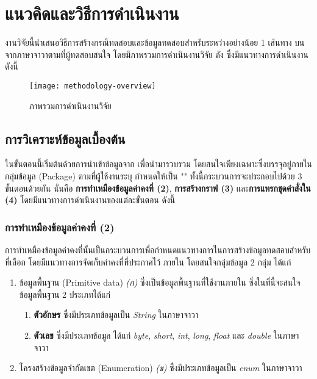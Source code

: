 \section{แนวคิดและวิธีการดำเนินงาน}
\label{sec:methodology}

งานวิจัยนี้นำเสนอวิธีการสร้างกรณีทดสอบและข้อมูลทดสอบสำหรับ{\TestPath}ระหว่าง{\CUT}อย่างน้อย 1 เส้นทาง 
บน{\StaticInformation}จาก{\sourcecode}ภาษาจาวาตามที่ผู้ทดสอบสนใจ โดยมีภาพรวมการดำเนินงานวิจัย 
ดัง ซึ่งมีแนวทางการดำเนินงานดังนี้

\begin{sidewaysfigure}
    \centering
    \texttt{[image: methodology-overview]}
    \caption{ภาพรวมการดำเนินงานวิจัย}
    \label{fig:methodologyoverview}
\end{sidewaysfigure}

\subsection{การวิเคราะห์ข้อมูลเบื้องต้น}
\label{subs:introsection}

ในขั้นตอนนี้เริ่มต้นด้วยการนำเข้าข้อมูล{\sourcecode}จาก{\Repository} เพื่อนำมารวบรวม{\StaticInformation} 
โดยสนใจเพียงเฉพาะ{\class}ซึ่งบรรจุอยู่ภายในกลุ่มข้อมูล (Package) ตามที่ผู้ใช้งานระบุ กำหนดให้เป็น "\FirstTimeDefine{\CUT}{\CUTEN}" 
ทั้งนี้กระบวนการจะประกอบไปด้วย 3 ขั้นตอนด้วยกัน นั่นคือ
{\bf การทำเหมืองข้อมูลค่าคงที่ (2)}, {\bf การสร้างกราฟ (3)} และ{\bf การแทรกชุดคำสั่งใน{\sourcecode} (4)} โดยมีแนวทางการดำเนินงานของแต่ละขั้นตอน 
ดังนี้

\subsubsection{การทำเหมืองข้อมูลค่าคงที่ (2)}

การทำเหมืองข้อมูลค่าคงที่นั้นเป็นกระบวนการเพื่อกำหนดแนวทางการในการสร้างข้อมูลทดสอบสำหรับ{\TestPath}ที่เลือก โดยมีแนวทางการจัดเก็บค่าคงที่ที่ประกาศไว้
ภายใน{\sourcecode} โดยสนใจกลุ่มข้อมูล 2 กลุ่ม ได้แก่

\begin{enumerate}
    \item ข้อมูลพื้นฐาน (Primitive data) {\it (ก)} ซึ่งเป็นข้อมูลพื้นฐานที่ใช้งานภายใน{\class} ซึ่งในที่นี้จะสนใจข้อมูลพื้นฐาน 2 ประเภทได้แก่
        \begin{enumerate}
            \item {\bf ตัวอักษร} ซึ่งมีประเภทข้อมูลเป็น {\it String} ในภาษาจาวา
            \item {\bf ตัวเลข} ซึ่งมีประเภทข้อมูล ได้แก่ {\it byte}, {\it short}, {\it int}, {\it long}, {\it float} 
               และ {\it double} ในภาษาจาวา
        \end{enumerate}
    \item โครงสร้างข้อมูลจำกัดเขต (Enumeration) {\it (ข)} ซึ่งมีประเภทข้อมูลเป็น {\it enum} ในภาษาจาวา
\end{enumerate}

